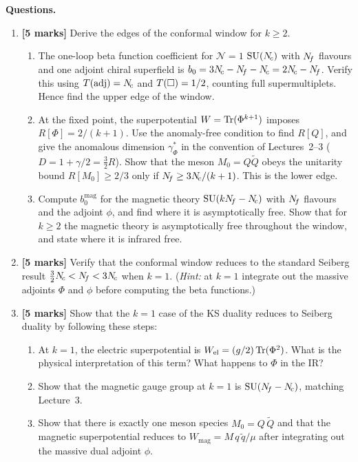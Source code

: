 \documentclass[11pt,a4paper]{article}
\begin{document}
\noindent\textbf{Questions.}
\begin{enumerate}[label=(\alph*)]

  \item \textbf{[5 marks]}
    Derive the edges of the conformal window for $k \geq 2$.
    \begin{enumerate}[label=(\roman*)]
      \item The one-loop beta function coefficient for $\mathcal{N}=1$
        $\mathrm{SU}(N_{\!c})$ with $N_{\!f}$ flavours and one adjoint chiral
        superfield is $b_0 = 3N_{\!c} - N_{\!f} - N_{\!c} = 2N_{\!c} - N_{\!f}$.  Verify
        this using $T(\mathrm{adj}) = N_{\!c}$ and $T(\square) = 1/2$, counting full
        supermultiplets.  Hence find the upper edge of the window.
      \item At the fixed point, the superpotential
        $W = \mathrm{Tr}(\Phi^{k+1})$ imposes $R[\Phi] = 2/(k+1)$.  Use the
        anomaly-free condition to find $R[Q]$, and give the anomalous
        dimension $\gamma_\Phi^*$ in the convention of Lectures~2--3
        ($D = 1 + \gamma/2 = \tfrac{3}{2}R$).  Show that the meson
        $M_0 = Q\widetilde{Q}$ obeys the unitarity bound
        $R[M_0] \geq 2/3$ only if $N_{\!f} \geq 3N_{\!c}/(k+1)$.  This is the
        lower edge.
      \item Compute $b_0^{\text{mag}}$ for the magnetic theory
        $\mathrm{SU}(kN_{\!f} - N_{\!c})$ with $N_{\!f}$ flavours and the adjoint $\phi$,
        and find where it is asymptotically free.  Show that for
        $k \geq 2$ the magnetic theory is asymptotically free throughout
        the window, and state where it is infrared free.
    \end{enumerate}

  \item \textbf{[5 marks]}
    Verify that the conformal window reduces to the standard
    Seiberg result $\tfrac{3}{2}N_{\!c} < N_{\!f} < 3N_{\!c}$ when $k = 1$.
    (\textit{Hint:} at $k = 1$ integrate out the massive adjoints
    $\Phi$ and $\phi$ before computing the beta functions.)

  \item \textbf{[5 marks]}
    Show that the $k = 1$ case of the KS duality reduces to Seiberg
    duality by following these steps:
    \begin{enumerate}[label=(\roman*)]
      \item At $k = 1$, the electric superpotential is
        $W_{\text{el}} = (g/2)\,\mathrm{Tr}(\Phi^2)$.  What is the physical
        interpretation of this term?  What happens to $\Phi$ in the IR?
      \item Show that the magnetic gauge group at $k = 1$ is
        $\mathrm{SU}(N_{\!f} - N_{\!c})$, matching Lecture~3.
      \item Show that there is exactly one meson species $M_0 =
        Q\,\widetilde{Q}$ and that the magnetic superpotential reduces
        to $W_{\text{mag}} = M\,q\,\widetilde{q}/\mu$ after
        integrating out the massive dual adjoint $\phi$.
    \end{enumerate}


\end{enumerate}
\end{document}
